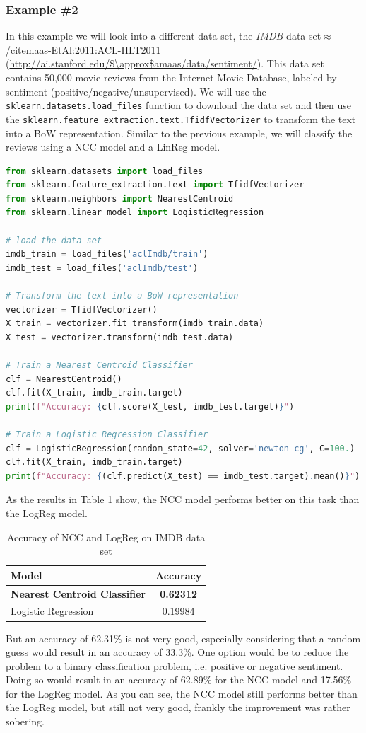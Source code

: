 \subsubsection{Example \#2}
In this example we will look into a different data set, the \textit{IMDB} data set$\approx$/cite{maas-EtAl:2011:ACL-HLT2011} (\url{http://ai.stanford.edu/$\approx$amaas/data/sentiment/}).
This data set contains 50,000 movie reviews from the Internet Movie Database, labeled by sentiment (positive/negative/unsupervised).
We will use the \lstinline{sklearn.datasets.load_files} function to download the data set and then use the \lstinline{sklearn.feature_extraction.text.TfidfVectorizer}
to transform the text into a BoW representation.
Similar to the previous example, we will classify the reviews using a NCC model and a LinReg model.

\begin{lstlisting}[language=Python, caption={IMDB example}, label={code:imdb}]
from sklearn.datasets import load_files
from sklearn.feature_extraction.text import TfidfVectorizer
from sklearn.neighbors import NearestCentroid
from sklearn.linear_model import LogisticRegression

# load the data set
imdb_train = load_files('aclImdb/train')
imdb_test = load_files('aclImdb/test')

# Transform the text into a BoW representation
vectorizer = TfidfVectorizer()
X_train = vectorizer.fit_transform(imdb_train.data)
X_test = vectorizer.transform(imdb_test.data)

# Train a Nearest Centroid Classifier
clf = NearestCentroid()
clf.fit(X_train, imdb_train.target)
print(f"Accuracy: {clf.score(X_test, imdb_test.target)}")

# Train a Logistic Regression Classifier
clf = LogisticRegression(random_state=42, solver='newton-cg', C=100.)
clf.fit(X_train, imdb_train.target)
print(f"Accuracy: {(clf.predict(X_test) == imdb_test.target).mean()}")
\end{lstlisting}
As the results in Table \ref{tab:imdb} show, the NCC model performs better on this task than the LogReg model.
\begin{table}[h]
  \centering
  \begin{tabular}{|l|c|}
    \hline
    \textbf{Model} & \textbf{Accuracy} \\
    \hline
    \textbf{Nearest Centroid Classifier} & \textbf{0.62312}\\
    Logistic Regression & 0.19984\\
    \hline
  \end{tabular}
  \caption{Accuracy of NCC and LogReg on IMDB data set}
  \label{tab:imdb}
\end{table}
But an accuracy of 62.31\% is not very good, especially considering that a random guess would result in an accuracy of 33.3\%.
One option would be to reduce the problem to a binary classification problem, i.e. positive or negative sentiment.
Doing so would result in an accuracy of 62.89\% for the NCC model and 17.56\% for the LogReg model.
As you can see, the NCC model still performs better than the LogReg model, but still not very good, frankly the improvement was rather sobering.

